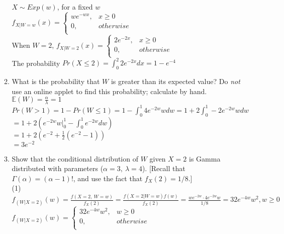 \documentclass[11pt]{article}
\begin{document}
\begin{enumerate}[label=\textbf{Question \arabic*:},start=1]
\begin{enumerate}
$X \sim Exp(w)$, for a fixed $w$ \\
$f_{X | W = w}(x) = \begin{cases}
		w e^{-wx}, & x \geq 0 \\ 
		0, & otherwise\\
		\end{cases}$\\


When $W = 2$, $f_{X | W = 2}(x) = \begin{cases}
		2 e^{-2x}, & x \geq 0 \\ 
		0, & otherwise\\
		\end{cases}$\\
		
The probability $Pr(X \leq 2) = \int_{0}^{2} 2 e^{-2x} dx = 1 - e^{-4}$\\


\item What is the probability that $W$ is greater than its expected value? Do {\em not} use an online applet to find this probability; calculate by hand.\\

$\mathbb{E}(W) = \frac{\alpha}{\lambda} = 1$ \\
$Pr(W > 1) = 1 - Pr(W \leq 1) = 1 - \int_{0}^{1} 4 e^{-2w} w dw = 1 + 2 \int_{0}^{1} -2 e^{-2w} w dw$ \\
$ = 1 + 2 ( e^{-2w} w |_{0}^{1} - \int_{0}^{1} e^{-2w}dw ) $\\
$ = 1 + 2 ( e^{-2} + \frac{1}{2} (e^{-2} - 1))$ \\
$ = 3 e^{-2} $\\ 


\item Show that the conditional distribution of $W$ given $X=2$ is Gamma distributed with parameters ($\alpha=3,\ \lambda=4$). [Recall that $\Gamma(\alpha) = (\alpha-1)!$, and use the fact that $f_X(2) = 1/8$.]\\

(1) $f_{(W | X = 2)}(w) = \frac{f(X=2,\ W=w)}{f_X(2)} = \frac{f(X=2|W=w) f(w)}{f_X(2)} =  \frac{w e^{-2w} \cdot 4 e^{-2w} w}{1/8} = 32 e^{-4w} w^2 , w \geq 0$\\
$f_{(W | X = 2)}(w) =\begin{cases}
		32 e^{-4w} w^2, & w \geq 0 \\ 
		0, & otherwise\\
		\end{cases}$\\



\end{enumerate}
\end{enumerate}
\end{document}
